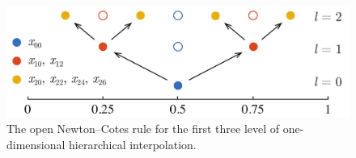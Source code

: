 \begin{figure}[t]
  \centering
  \includegraphics[width=1.0\columnwidth]{include/assets/figures/grid.pdf}
  \vspace{-1.5em}
  \caption{
    The open Newton--Cotes rule for the first three level of one-dimensional
    hierarchical interpolation.
  }
\end{figure}
